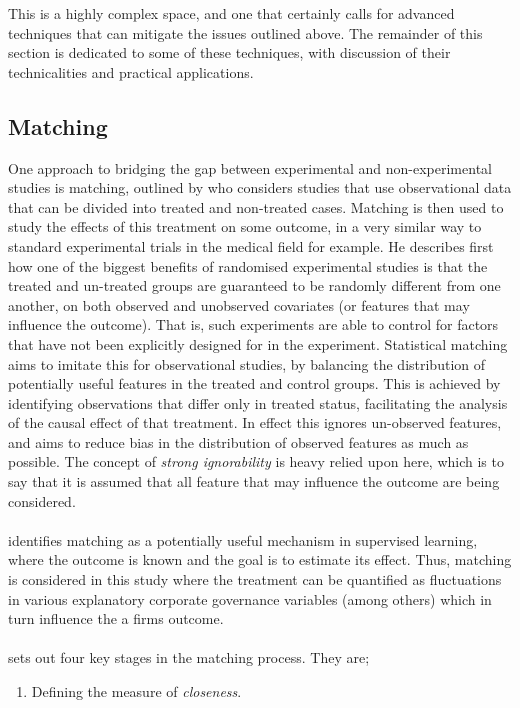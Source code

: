 {This is a highly complex space, and one that certainly calls for advanced techniques that can mitigate the issues outlined above. The remainder of this section is dedicated to some of these techniques, with discussion of their technicalities and practical applications.  }
\subsection{Matching}\label{matching}
{One approach to bridging the gap between experimental and non-experimental studies is matching, outlined by \cite{stuart2010matching} who considers studies that use observational data that can be divided into treated and non-treated cases. Matching is then used to study the effects of this treatment on some outcome, in a very similar way to standard experimental trials in the medical field for example. He describes first how one of the biggest benefits of randomised experimental studies is that the treated and un-treated groups are guaranteed to be randomly different from one another, on both observed and unobserved covariates (or features that may influence the outcome). That is, such experiments are able to control for factors that have not been explicitly designed for in the experiment. Statistical matching aims to imitate this for observational studies, by balancing the distribution of potentially useful features in the treated and control groups. This is achieved by identifying observations that differ only in treated status, facilitating the analysis of the causal effect of that treatment. In effect this ignores un-observed features, and aims to reduce bias in the distribution of observed features as much as possible. The concept of {\it strong ignorability} is heavy relied upon here, which is to say that it is assumed that all feature that may influence the outcome are being considered. \\\\
\cite {stuart2010matching} identifies matching as a potentially useful mechanism in supervised learning, where the outcome is known and the goal is to estimate its effect. Thus, matching is considered in this study where the treatment can be quantified as fluctuations in various explanatory corporate governance variables (among others) which in turn influence the a firms outcome. \\\\
\cite {stuart2010matching} sets out four key stages in the matching process. They are;
\begin {enumerate}
\item{Defining the measure of {\it closeness}.}

\end{enumerate}}
